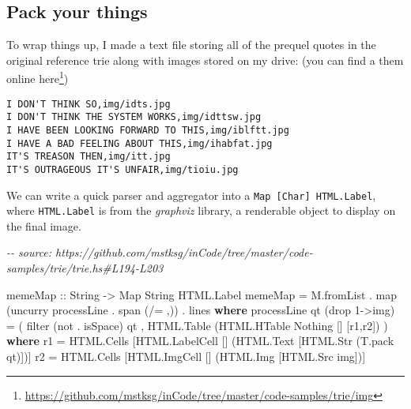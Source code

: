 \documentclass[]{article}
\newenvironment{Shaded}{}{}
\newcommand{\CharTok}[1]{\textcolor[rgb]{0.25,0.44,0.63}{#1}}
\newcommand{\CommentTok}[1]{\textcolor[rgb]{0.38,0.63,0.69}{\textit{#1}}}
\newcommand{\DataTypeTok}[1]{\textcolor[rgb]{0.56,0.13,0.00}{#1}}
\newcommand{\DecValTok}[1]{\textcolor[rgb]{0.25,0.63,0.44}{#1}}
\newcommand{\FunctionTok}[1]{\textcolor[rgb]{0.02,0.16,0.49}{#1}}
\newcommand{\KeywordTok}[1]{\textcolor[rgb]{0.00,0.44,0.13}{\textbf{#1}}}
\newcommand{\NormalTok}[1]{#1}
\newcommand{\OperatorTok}[1]{\textcolor[rgb]{0.40,0.40,0.40}{#1}}
\newcommand{\OtherTok}[1]{\textcolor[rgb]{0.00,0.44,0.13}{#1}}
\renewcommand{\href}[2]{#2\footnote{\url{#1}}}
\begin{document}
\subsection{Pack your things}\label{pack-your-things}

To wrap things up, I made a text file storing all of the prequel quotes in the
original reference trie along with images stored on my drive: (you can find a
them
\href{https://github.com/mstksg/inCode/tree/master/code-samples/trie/img}{online
here})

\begin{verbatim}
I DON'T THINK SO,img/idts.jpg
I DON'T THINK THE SYSTEM WORKS,img/idttsw.jpg
I HAVE BEEN LOOKING FORWARD TO THIS,img/iblftt.jpg
I HAVE A BAD FEELING ABOUT THIS,img/ihabfat.jpg
IT'S TREASON THEN,img/itt.jpg
IT'S OUTRAGEOUS IT'S UNFAIR,img/tioiu.jpg
\end{verbatim}

We can write a quick parser and aggregator into a
\texttt{Map\ {[}Char{]}\ HTML.Label}, where \texttt{HTML.Label} is from the
\emph{graphviz} library, a renderable object to display on the final image.

\begin{Shaded}
\begin{Highlighting}[]
\CommentTok{{-}{-} source: https://github.com/mstksg/inCode/tree/master/code{-}samples/trie/trie.hs\#L194{-}L203}

\OtherTok{memeMap ::} \DataTypeTok{String} \OtherTok{{-}\textgreater{}} \DataTypeTok{Map} \DataTypeTok{String} \DataTypeTok{HTML.Label}
\NormalTok{memeMap }\OtherTok{=}\NormalTok{ M.fromList }\OperatorTok{.} \FunctionTok{map}\NormalTok{ (}\FunctionTok{uncurry}\NormalTok{ processLine }\OperatorTok{.} \FunctionTok{span}\NormalTok{ (}\OperatorTok{/=} \CharTok{\textquotesingle{},\textquotesingle{}}\NormalTok{)) }\OperatorTok{.} \FunctionTok{lines}
  \KeywordTok{where}
\NormalTok{    processLine qt (}\FunctionTok{drop} \DecValTok{1}\OtherTok{{-}\textgreater{}}\NormalTok{img) }\OtherTok{=}\NormalTok{ (}
          \FunctionTok{filter}\NormalTok{ (}\FunctionTok{not} \OperatorTok{.} \FunctionTok{isSpace}\NormalTok{) qt}
\NormalTok{        , }\DataTypeTok{HTML.Table}\NormalTok{ (}\DataTypeTok{HTML.HTable} \DataTypeTok{Nothing}\NormalTok{ [] [r1,r2])}
\NormalTok{        )}
      \KeywordTok{where}
\NormalTok{        r1 }\OtherTok{=} \DataTypeTok{HTML.Cells}\NormalTok{ [}\DataTypeTok{HTML.LabelCell}\NormalTok{ [] (}\DataTypeTok{HTML.Text}\NormalTok{ [}\DataTypeTok{HTML.Str}\NormalTok{ (T.pack qt)])]}
\NormalTok{        r2 }\OtherTok{=} \DataTypeTok{HTML.Cells}\NormalTok{ [}\DataTypeTok{HTML.ImgCell}\NormalTok{   [] (}\DataTypeTok{HTML.Img}\NormalTok{ [}\DataTypeTok{HTML.Src}\NormalTok{ img])]}
\end{Highlighting}
\end{Shaded}
\end{document}
